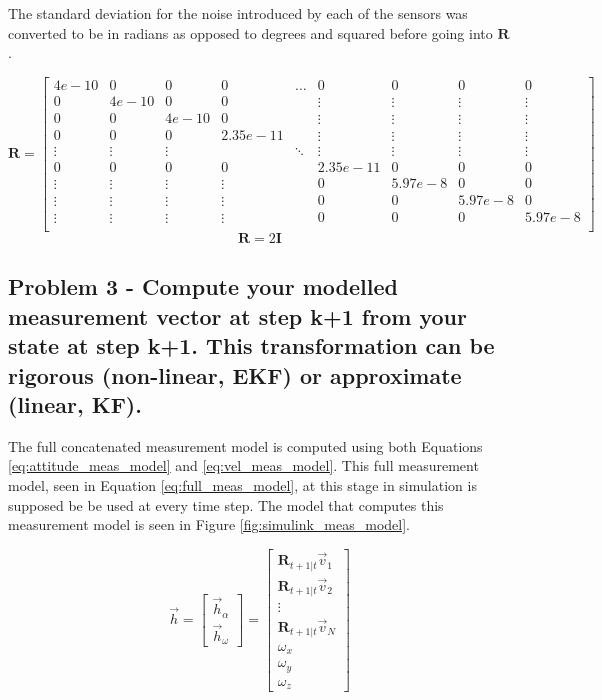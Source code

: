 The standard deviation for the noise introduced by each of the sensors was converted to be in radians as opposed to degrees and squared before going into $\boldsymbol{R}$.

\begin{equation*}
    \boldsymbol{R} = \begin{bmatrix} 
        4e-10 & 0 & 0 & 0 & \dots & 0 & 0 & 0 & 0\\
        0 & 4e-10 & 0 & 0 &  & \vdots & \vdots & \vdots & \vdots \\
        0 & 0 & 4e-10 & 0 &  & \vdots & \vdots & \vdots & \vdots \\
        0 & 0 & 0 & 2.35e-11 &  & \vdots & \vdots & \vdots & \vdots \\
        \vdots & \vdots & \vdots & &  \ddots &\vdots &\vdots&\vdots & \vdots\\
        0 & 0 & 0 & 0 &  & 2.35e-11 & 0 & 0 & 0 \\
        \vdots & \vdots & \vdots & \vdots & & 0 & 5.97e-8 & 0 & 0 \\
        \vdots & \vdots & \vdots & \vdots & & 0 & 0 & 5.97e-8 & 0  \\
        \vdots & \vdots & \vdots & \vdots &  & 0 & 0 & 0 & 5.97e-8\\
    \end{bmatrix} 
\end{equation*}
\begin{equation*}
    \boldsymbol{R} 
    = 2 \boldsymbol{I}
\end{equation*}

\subsection{Problem 3 - Compute your modelled measurement vector at step k+1 from your state at step k+1. This transformation can be rigorous (non-linear, EKF) or approximate (linear, KF).}

The full concatenated measurement model is computed using both Equations \ref{eq:attitude_meas_model} and \ref{eq:vel_meas_model}. This full measurement model, seen in Equation \ref{eq:full_meas_model}, at this stage in simulation is supposed be be used at every time step. The model that computes this measurement model is seen in Figure \ref{fig:simulink_meas_model}.

\begin{equation} \label{eq:full_meas_model}
    \vec{h} = \begin{bmatrix}
        \vec{h}_{\alpha} \\ \vec{h}_{\omega}
    \end{bmatrix} = \begin{bmatrix}
        \boldsymbol{R}_{t+1 \vert t} \vec{v}_1 \\
        \boldsymbol{R}_{t+1 \vert t} \vec{v}_2 \\
        \vdots \\
        \boldsymbol{R}_{t+1 \vert t} \vec{v}_N \\
        \omega_x \\
        \omega_y \\
        \omega_z
    \end{bmatrix}
\end{equation}

